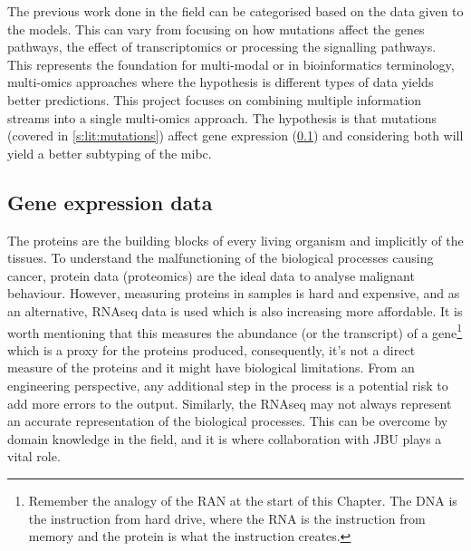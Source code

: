 
The previous work done in the field can be categorised based on the data given to the models. This can vary from focusing on how mutations affect the genes pathways, the effect of transcriptomics or processing the signalling pathways. This represents the foundation for multi-modal or in bioinformatics terminology, multi-omics approaches where the hypothesis is different types of data yields better predictions. This project focuses on combining multiple information streams into a single multi-omics approach. The hypothesis is that mutations (covered in \cref{s:lit:mutations}) affect gene expression (\cref{s:lit:rnaSeq}) and considering both will yield a better subtyping of the \acrlong{mibc}.

\subsection{Gene expression data} \label{s:lit:rnaSeq}

\vspace{3mm}
\vspace{3mm}

The proteins are the building blocks of every living organism and implicitly of the tissues. To understand the malfunctioning of the biological processes causing cancer, protein data (proteomics) are the ideal data to analyse malignant behaviour. However, measuring proteins in samples is hard and expensive, and as an alternative, RNAseq data is used which is also increasing more affordable. It is worth mentioning that this measures the abundance (or the transcript) of a gene\footnote{Remember the analogy of the RAN at the start of this Chapter. The DNA is the instruction from hard drive, where the RNA is the instruction from memory and the protein is what the instruction creates.} which is a proxy for the proteins produced, consequently, it's not a direct measure of the proteins and it might have biological limitations. From an engineering perspective, any additional step in the process is a potential risk to add more errors to the output. Similarly, the RNAseq may not always represent an accurate representation of the biological processes. This can be overcome by domain knowledge in the field, and it is where collaboration with JBU plays a vital role.

